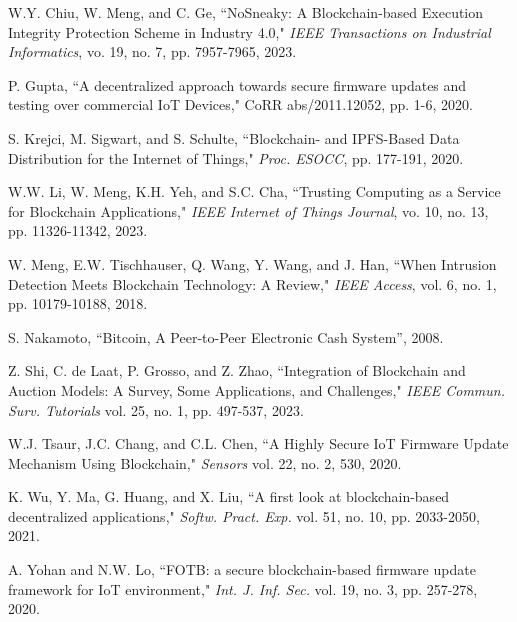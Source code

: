 \documentclass[conference]{IEEEtran}
\begin{document}
\begin{thebibliography}{100}
W.Y. Chiu, W. Meng, and C. Ge, ``NoSneaky: A Blockchain-based Execution Integrity Protection Scheme in Industry 4.0," \emph{IEEE Transactions on Industrial Informatics}, vo. 19, no. 7, pp. 7957-7965, 2023.

P. Gupta,
``A decentralized approach towards secure firmware updates and testing over commercial IoT Devices," CoRR abs/2011.12052, pp. 1-6, 2020.

S. Krejci, M. Sigwart, and S. Schulte,
``Blockchain- and IPFS-Based Data Distribution for the Internet of Things," \emph{Proc. ESOCC}, pp. 177-191, 2020.

W.W. Li, W. Meng, K.H. Yeh, and S.C. Cha, ``Trusting Computing as a Service for Blockchain Applications," \emph{IEEE Internet of Things Journal}, vo. 10, no. 13, pp. 11326-11342, 2023.

W. Meng, E.W. Tischhauser, Q. Wang, Y. Wang, and J. Han, ``When Intrusion Detection Meets Blockchain Technology: A Review," \emph{IEEE Access}, vol. 6, no. 1, pp. 10179-10188, 2018.

S. Nakamoto, ``Bitcoin, A Peer-to-Peer Electronic Cash System'', 2008.

Z. Shi, C. de Laat, P. Grosso, and Z. Zhao,
``Integration of Blockchain and Auction Models: A Survey, Some Applications, and Challenges," \emph{IEEE Commun. Surv. Tutorials} vol. 25, no. 1, pp. 497-537, 2023.

W.J. Tsaur, J.C. Chang, and C.L. Chen,
``A Highly Secure IoT Firmware Update Mechanism Using Blockchain," \emph{Sensors} vol. 22, no. 2, 530, 2020.

K. Wu, Y. Ma, G. Huang, and X. Liu,
``A first look at blockchain-based decentralized applications," \emph{Softw. Pract. Exp.} vol. 51, no. 10, pp. 2033-2050, 2021.

A. Yohan and N.W. Lo,
``FOTB: a secure blockchain-based firmware update framework for IoT environment," \emph{Int. J. Inf. Sec.} vol. 19, no. 3, pp. 257-278, 2020.







	
\end{thebibliography}
\end{document}
